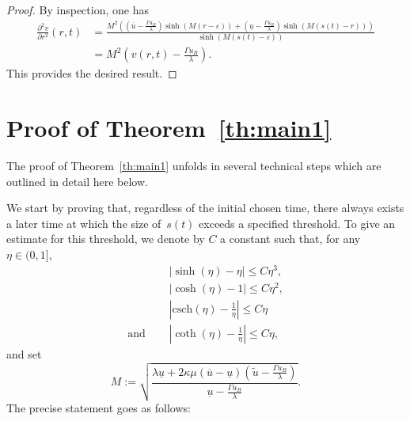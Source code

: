 \documentclass[12pt,a4paper,intlimits,sumlimits]{amsart}
\theoremstyle{definition}
\theoremstyle{plain}
\numberwithin{equation}{section}
\renewcommand{\leq}{\leqslant}
\begin{document}
\begin{proof}
By inspection, one has
\[
\begin{aligned}
\frac{\partial^2v}{\partial r^2}(r, t)&=\frac{M^2\left(\left(\overline{u}-\frac{\Gamma u_B}{\lambda}\right)\sinh(M(r-\varepsilon)) +\left(\underline{u}-\frac{\Gamma u_B}{\lambda}\right)\sinh(M(s(t)-r))\right)}{\sinh(M(s(t)-\varepsilon))}\\
& = M^2\left( v(r, t)-\frac{\Gamma u_B}{\lambda}\right).
\end{aligned}
\]
This provides the desired result.
\end{proof}

\section{Proof of Theorem~\ref{th:main1}}\label{mkljnbgvyftcdrxsedctfvygbhunijm}

The proof of Theorem~\ref{th:main1} unfolds in several technical steps which are outlined in detail here below.

We start by proving that, regardless of the initial chosen time, there always exists a later time at which the size of~$s(t)$ exceeds a specified threshold.
To give an estimate for this threshold, we denote by $C$ a constant such that, for any $\eta \in (0, 1]$,
\begin{equation}\label{vbuewi58221wsd4trg7uij}
\begin{split}
&|\sinh(\eta)-\eta| \leq C\eta^3,\\
&|\cosh(\eta)-1|\leq C\eta^2,\\
&|\mbox{csch}(\eta)-\frac1{\eta}|\leq C\eta\\
{\mbox{and }}\quad &|\coth(\eta)-\frac1{\eta}| \leq C \eta,
\end{split}
\end{equation}
and set
\begin{equation}\label{vcew3495863tfhfaefojgews}
M:=\sqrt{\dfrac{\lambda\underline{u} + 2\kappa\mu(\overline{u}-\underline{u})(\widetilde u-\frac{\Gamma u_B}{\lambda})}{\underline{u}-\frac{\Gamma u_B}{\lambda}}}.
\end{equation}
The precise statement goes as follows:
\end{document}

